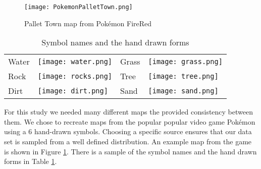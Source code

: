 \begin{figure}[h]
\begin{center}
\texttt{[image: PokemonPalletTown.png]}
\end{center}
\caption{Pallet Town map from Pok\'{e}mon FireRed \cite{firered}}
\label{fig:pokemon}
\end{figure}

\begin{table}
\label{table:symbols}
\caption{Symbol names and the hand drawn forms}
\begin{center}
\begin{tabular}{llll}
Water & \texttt{[image: water.png]} &
Grass & \texttt{[image: grass.png]} \\
Rock & \texttt{[image: rocks.png]} &
Tree & \texttt{[image: tree.png]} \\
Dirt & \texttt{[image: dirt.png]} &
Sand & \texttt{[image: sand.png]} \\
\end{tabular}
\end{center}
\end{table}


For this study we needed many different maps the provided consistency between
them. We chose to recreate maps from the popular popular video game Pok\'{e}mon
using a 6 hand-drawn symbols. Choosing a specific source ensures that our data
set is sampled from a well defined distribution.  An example map from the game
is shown in Figure \ref{fig:pokemon}. There is a sample of the symbol names and
the hand drawn forms in Table \ref{table:symbols}.


